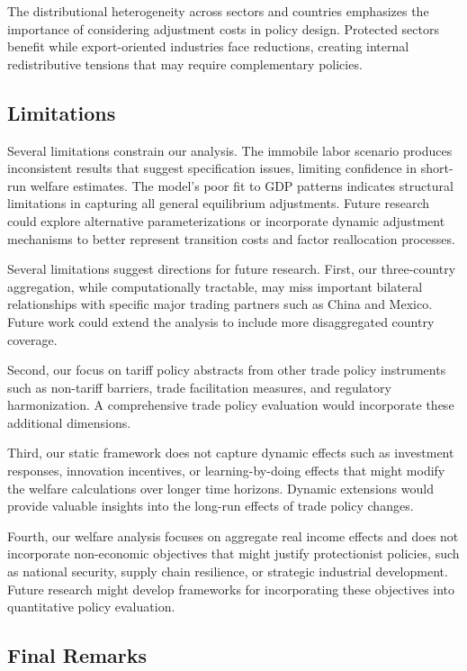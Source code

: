 The distributional heterogeneity across sectors and countries emphasizes the importance of considering adjustment costs in policy design. Protected sectors benefit while export-oriented industries face reductions, creating internal redistributive tensions that may require complementary policies.

\subsection{Limitations}

Several limitations constrain our analysis. The immobile labor scenario produces inconsistent results that suggest specification issues, limiting confidence in short-run welfare estimates. The model's poor fit to GDP patterns indicates structural limitations in capturing all general equilibrium adjustments. Future research could explore alternative parameterizations or incorporate dynamic adjustment mechanisms to better represent transition costs and factor reallocation processes.

Several limitations suggest directions for future research. First, our three-country aggregation, while computationally tractable, may miss important bilateral relationships with specific major trading partners such as China and Mexico. Future work could extend the analysis to include more disaggregated country coverage.

Second, our focus on tariff policy abstracts from other trade policy instruments such as non-tariff barriers, trade facilitation measures, and regulatory harmonization. A comprehensive trade policy evaluation would incorporate these additional dimensions.

Third, our static framework does not capture dynamic effects such as investment responses, innovation incentives, or learning-by-doing effects that might modify the welfare calculations over longer time horizons. Dynamic extensions would provide valuable insights into the long-run effects of trade policy changes.

Fourth, our welfare analysis focuses on aggregate real income effects and does not incorporate non-economic objectives that might justify protectionist policies, such as national security, supply chain resilience, or strategic industrial development. Future research might develop frameworks for incorporating these objectives into quantitative policy evaluation.

\subsection{Final Remarks}

